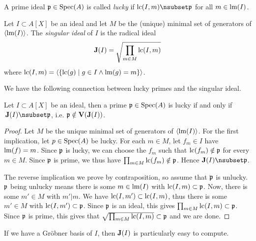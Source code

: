 \begin{definition}\label{def:lucky}
  A prime ideal $\mathfrak p \in \operatorname{Spec}(A)$ is called \textit{lucky} if $\LC(I, m) \nsubset \p$ for all $m \in \operatorname{lm}(I)$.
\end{definition}

\begin{definition}
  Let $I \subset A[X]$ be an ideal and let $M$ be the (unique) minimal set of generators of $\langle \operatorname{lm}(I) \rangle$. The \textit{singular ideal} of $I$ is the radical ideal
  \[\operatorname{\mathbf J}(I) = \sqrt{\prod_{m \in M} \operatorname{lc}(I, m)}\]
  where $\operatorname{lc}(I, m) = \langle \{\operatorname{lc}(g) \mid g \in I \land \operatorname{lm}(g) = m\} \rangle$.
\end{definition}

We have the following connection between lucky primes and the singular ideal.

\begin{lemma}\label{lem:lucky_iff_not_singular}
  Let $I \subset A[X]$ be an ideal, then a prime $\mathfrak p \in \operatorname{Spec}(A)$ is lucky if and only if $\,\J(I) \nsubset \p$, i.e. $\mathfrak p \notin \operatorname{\mathbf V}(\operatorname{\mathbf J}(I))$.
\end{lemma}
\begin{proof}
  Let $M$ be the unique minimal set of generators of $\langle \operatorname{lm}(I) \rangle$. For the first implication, let $p \in \operatorname{Spec}(A)$ be lucky. For each $m \in M$, let $f_{m} \in I$ have $\operatorname{lm}(f) = m$. Since $\mathfrak p$ is lucky, we can choose the $f_{m}$ such that $\operatorname{lc}(f_{m}) \notin \mathfrak p$ for every $m \in M$. Since $\mathfrak p$ is prime, we thus have $\prod_{m \in M} \operatorname{lc}(f_{m}) \notin \mathfrak p$. Hence $\J(I) \nsubset \p$.

  The reverse implication we prove by contraposition, so assume that $\mathfrak p$ is unlucky. $\mathfrak p$ being unlucky means there is some $m \in \operatorname{lm}(I)$ with $\operatorname{lc}(I, m) \subset \mathfrak p$. Now, there is some $m' \in M$ with $m' | m$. We have $\operatorname{lc}(I, m') \subset \operatorname{lc}(I, m)$, thus there is some $m' \in M$ with $\operatorname{lc}(I, m') \subset \mathfrak p$. Since $\mathfrak p$ is an ideal, this gives $\prod_{m \in M} \operatorname{lc}(I, m) \subset \mathfrak p$. Since $\mathfrak p$ is prime, this gives that $\sqrt{\prod_{m \in M} \operatorname{lc}(I, m)} \subset \mathfrak p$ and we are done.
\end{proof}



If we have a Gröbner basis of $I$, then $\operatorname{\mathbf J}(I)$ is particularly easy to compute.

